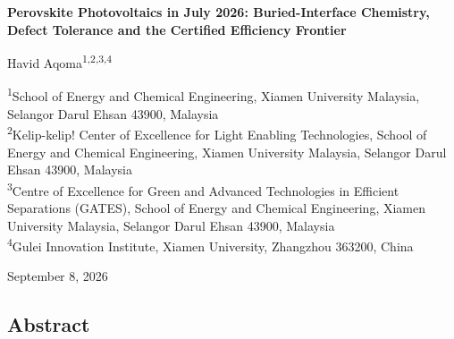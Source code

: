 \documentclass[
  11pt,
]{article}
\author{}
\date{}
\begin{document}
\begin{center}
{\LARGE\bfseries Perovskite Photovoltaics in July 2026: Buried-Interface Chemistry, Defect Tolerance and the Certified Efficiency Frontier\par}
\vspace{1.1em}
{\large Havid Aqoma\textsuperscript{1,2,3,4}\par}
\vspace{0.7em}
\begin{minipage}{\textwidth}\centering\small
\textsuperscript{1}School of Energy and Chemical Engineering, Xiamen University Malaysia, Selangor Darul Ehsan 43900, Malaysia\\[0.25em]
\textsuperscript{2}Kelip-kelip! Center of Excellence for Light Enabling Technologies, School of Energy and Chemical Engineering, Xiamen University Malaysia, Selangor Darul Ehsan 43900, Malaysia\\[0.25em]
\textsuperscript{3}Centre of Excellence for Green and Advanced Technologies in Efficient Separations (GATES), School of Energy and Chemical Engineering, Xiamen University Malaysia, Selangor Darul Ehsan 43900, Malaysia\\[0.25em]
\textsuperscript{4}Gulei Innovation Institute, Xiamen University, Zhangzhou 363200, China\\[0.25em]
\end{minipage}
\vspace{2.2em}
{\small September 8, 2026\par}
\end{center}
\vspace{1.0em}

\subsection{Abstract}\label{abstract}
\end{document}

